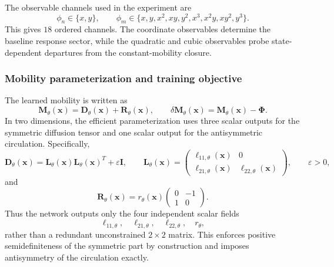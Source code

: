 \documentclass[11pt,twoside,fleqn]{article}
\begin{document}
The observable channels used in the experiment are
\begin{equation}
    \phi_n\in\{x,y\},
    \qquad
    \phi_m\in
    \{x,y,x^2,xy,y^2,x^3,x^2y,xy^2,y^3\}.
    \label{eq:app_affine_2d_observable_library}
\end{equation}
This gives \(18\) ordered channels. The coordinate observables determine the baseline response sector, while the quadratic and cubic observables probe state-dependent departures from the constant-mobility closure.

\subsubsection{Mobility parameterization and training objective}

The learned mobility is written as
\begin{equation}
    \bm{M}_\theta(\bm{x})
    =
    \bm{D}_\theta(\bm{x})
    +
    \bm{R}_\theta(\bm{x}),
    \qquad
    \delta\bm{M}_\theta(\bm{x})
    =
    \bm{M}_\theta(\bm{x})-\bm{\Phi}.
    \label{eq:app_affine_2d_M_theta_split}
\end{equation}
In two dimensions, the efficient parameterization uses three scalar outputs for the symmetric diffusion tensor and one scalar output for the antisymmetric circulation. Specifically,
\begin{equation}
    \bm{D}_\theta(\bm{x})
    =
    \bm{L}_\theta(\bm{x})
    \bm{L}_\theta(\bm{x})^T
    +
    \varepsilon\bm{I},
    \qquad
    \bm{L}_\theta(\bm{x})
    =
    \begin{pmatrix}
        \ell_{11,\theta}(\bm{x}) & 0\\
        \ell_{21,\theta}(\bm{x}) & \ell_{22,\theta}(\bm{x})
    \end{pmatrix},
    \qquad
    \varepsilon>0,
    \label{eq:app_affine_2d_D_parameterization}
\end{equation}
and
\begin{equation}
    \bm{R}_\theta(\bm{x})
    =
    r_\theta(\bm{x})
    \begin{pmatrix}
        0 & -1\\
        1 & 0
    \end{pmatrix}.
    \label{eq:app_affine_2d_R_parameterization}
\end{equation}
Thus the network outputs only the four independent scalar fields
\[
    \ell_{11,\theta},\quad
    \ell_{21,\theta},\quad
    \ell_{22,\theta},\quad
    r_\theta,
\]
rather than a redundant unconstrained \(2\times2\) matrix. This enforces positive semidefiniteness of the symmetric part by construction and imposes antisymmetry of the circulation exactly.
\end{document}
